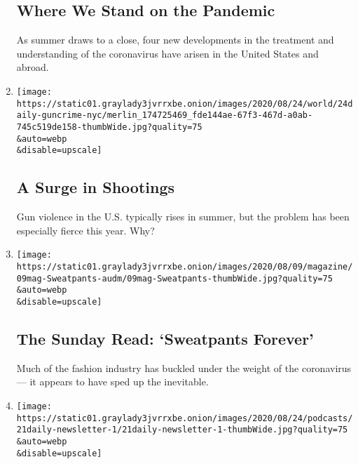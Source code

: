\begin{enumerate}
  \hypertarget{where-we-stand-on-the-pandemic}{%
  \subsection{Where We Stand on the
  Pandemic}\label{where-we-stand-on-the-pandemic}}

  As summer draws to a close, four new developments in the treatment and
  understanding of the coronavirus have arisen in the United States and
  abroad.
\item
  \href{/2020/08/24/podcasts/the-daily/gun-violence-new-york.html}{}

  \texttt{[image: https://static01.graylady3jvrrxbe.onion/images/2020/08/24/world/24daily-guncrime-nyc/merlin\_174725469\_fde144ae-67f3-467d-a0ab-745c519de158-thumbWide.jpg?quality=75\\\&auto=webp\\\&disable=upscale]}

  \hypertarget{a-surge-in-shootings}{%
  \subsection{A Surge in Shootings}\label{a-surge-in-shootings}}

  Gun violence in the U.S. typically rises in summer, but the problem
  has been especially fierce this year. Why?
\item
  \href{/2020/08/23/podcasts/the-daily/fashion-coronavirus.html}{}

  \texttt{[image: https://static01.graylady3jvrrxbe.onion/images/2020/08/09/magazine/09mag-Sweatpants-audm/09mag-Sweatpants-thumbWide.jpg?quality=75\\\&auto=webp\\\&disable=upscale]}

  \hypertarget{the-sunday-read-sweatpants-forever}{%
  \subsection{The Sunday Read: `Sweatpants
  Forever'}\label{the-sunday-read-sweatpants-forever}}

  Much of the fashion industry has buckled under the weight of the
  coronavirus --- it appears to have sped up the inevitable.
\item
  \href{/2020/08/21/podcasts/daily-newsletter-protest-adidas-segregation.html}{}

  \texttt{[image: https://static01.graylady3jvrrxbe.onion/images/2020/08/24/podcasts/21daily-newsletter-1/21daily-newsletter-1-thumbWide.jpg?quality=75\\\&auto=webp\\\&disable=upscale]}

  \hypertarget{the-daily-newsletter-2}{%
}
\end{enumerate}
